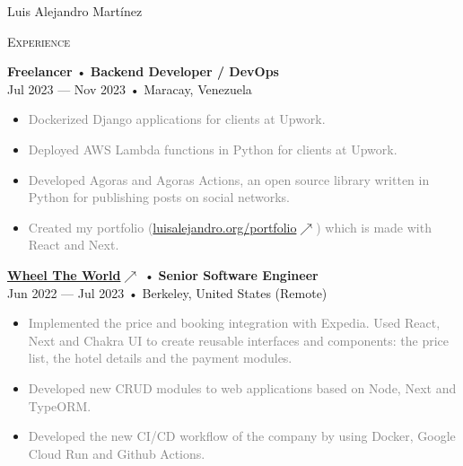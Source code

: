 \documentclass[12pt]{article}
\begin{document}
\begin{cv}{Luis Alejandro Mart\'inez}
\begin{minipage}[t]{0.55\textwidth}
    \textrm{\textsc{\Large{Experience}}}
    \newline
    \parbox[t]{\linewidth}{
      \textbf{Freelancer} • \textrm{\textbf{Backend Developer / DevOps}}\\
      Jul 2023 --- Nov 2023 • Maracay, Venezuela\\
      \footnotesize{
        \vspace{-\topsep}
        \vspace{-\topsep}
        \begin{itemize}
          \setlength{\parskip}{0pt}
          \setlength{\itemsep}{0pt}
          \item \textcolor{gray}{Dockerized Django applications for clients at Upwork.}
          \item \textcolor{gray}{Deployed AWS Lambda functions in Python for clients at Upwork.}
          \item \textcolor{gray}{Developed Agoras and Agoras Actions, an open source library written in Python for publishing posts on social networks.}
          \item \textcolor{gray}{Created my portfolio (\href{https://luisalejandro.org/portfolio}{luisalejandro.org/portfolio\footnotesize{$\nearrow$}}) which is made with React and Next.}
        \end{itemize}
      }
    }\vspace{0.125em}
    \parbox[t]{\linewidth}{
      \textbf{\href{https://wheeltheworld.com}{Wheel The World\footnotesize{$\nearrow$}}} • \textrm{\textbf{Senior Software Engineer}}\\
      Jun 2022 --- Jul 2023 • Berkeley, United States (Remote)\\
      \footnotesize{
        \vspace{-\topsep}
        \vspace{-\topsep}
        \begin{itemize}
          \setlength{\parskip}{0pt}
          \setlength{\itemsep}{0pt}
          \item \textcolor{gray}{Implemented the price and booking integration with Expedia. Used React, Next and Chakra UI to create reusable interfaces and components: the price list, the hotel details and the payment modules.}
          \item \textcolor{gray}{Developed new CRUD modules to web applications based on Node, Next and TypeORM.}
          \item \textcolor{gray}{Developed the new CI/CD workflow of the company by using Docker, Google Cloud Run and Github Actions.}

\end{itemize}}}
\end{minipage}
\end{cv}
\end{document}
